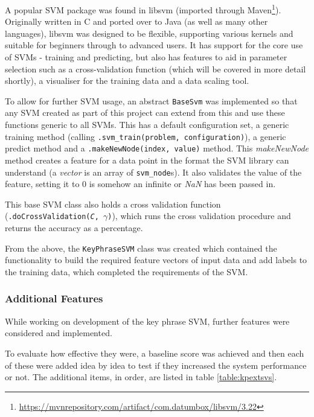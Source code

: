 A popular SVM package was found in libsvm (imported through Maven\footnote{\href{https://mvnrepository.com/artifact/com.datumbox/libsvm/3.22}{https://mvnrepository.com/artifact/com.datumbox/libsvm/3.22}}). Originally written in C and ported over to Java (as well as many other languages), libsvm was designed to be flexible, supporting various kernels and suitable for beginners through to advanced users. It has support for the core use of SVMs - training and predicting, but also has features to aid in parameter selection such as a cross-validation function (which will be covered in more detail shortly), a visualiser for the training data and a data scaling tool.

To allow for further SVM usage, an abstract \texttt{BaseSvm} was implemented so that any SVM created as part of this project can extend from this and use these functions generic to all SVMs. This has a default configuration set, a generic training method (calling \texttt{.svm\_train(problem, configuration)}), a generic predict method and a \texttt{.makeNewNode(index, value)} method. This \textit{makeNewNode} method creates a feature for a data point in the format the SVM library can understand (a \textit{vector} is an array of \texttt{svm\_node}s). It also validates the value of the feature, setting it to 0 is somehow an infinite or \textit{NaN} has been passed in. 

This base SVM class also holds a cross validation function (\texttt{.doCrossValidation(\textit{C}, $\gamma$)}), which runs the cross validation procedure and returns the accuracy as a percentage.

From the above, the \texttt{KeyPhraseSVM} class was created which contained the functionality to build the required feature vectors of input data and add labels to the training data, which completed the requirements of the SVM.

\subsubsection*{Additional Features}
While working on development of the key phrase SVM, further features were considered and implemented.

To evaluate how effective they were, a baseline score was achieved and then each of these were added idea by idea to test if they increased the system performance or not. The additional items, in order, are listed in table \ref{table:kpextsvs}. 

